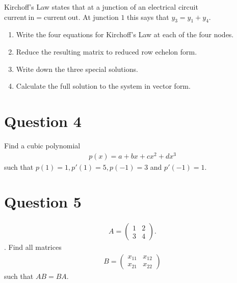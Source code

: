 \documentclass[letterpaper,10pt,english]{jupyterBook}
\let\sphinxpxdimen\pdfpxdimen\else\newdimen\sphinxpxdimen
\begin{document}
\sphinxAtStartPar
Kirchoff’s Law states that at a junction of an electrical circuit \(\mathrm{current~in}=\mathrm{current~out}\). At junction \(1\) this says that \(y_3 = y_1+y_4\).

\noindent{\hspace*{\fill}\sphinxincludegraphics[width=300\sphinxpxdimen]{{kirchoff}.png}\hspace*{\fill}}
\begin{enumerate}
%
\item {} 
\sphinxAtStartPar
Write the four equations for Kirchoff’s Law at each of the four nodes.

\item {} 
\sphinxAtStartPar
Reduce the resulting matrix to reduced row echelon form.

\item {} 
\sphinxAtStartPar
Write down the three special solutions.

\item {} 
\sphinxAtStartPar
Calculate the full solution to the system in vector form.

\end{enumerate}


\section{Question 4}
\label{\detokenize{LinearAlgebra/problems/problems_1:question-4}}


\sphinxAtStartPar
Find a cubic polynomial
\begin{equation*}
\begin{split}p(x) = a + bx + cx^2 + dx^3\end{split}
\end{equation*}
\sphinxAtStartPar
such that \(p(1) = 1, p'(1)=5, p(-1)=3\) and \(p'(-1)=1\).


\section{Question 5}
\label{\detokenize{LinearAlgebra/problems/problems_1:question-5}}\begin{equation*}
\begin{split}A = \begin{pmatrix}1 & 2\\ 3 & 4\end{pmatrix}.\end{split}
\end{equation*}
. Find all matrices
\begin{equation*}
\begin{split}B = \begin{pmatrix}x_{11} & x_{12} \\ x_{21} & x_{22}\end{pmatrix}\end{split}
\end{equation*}
\sphinxAtStartPar
such that \(AB=BA\).
\end{document}
